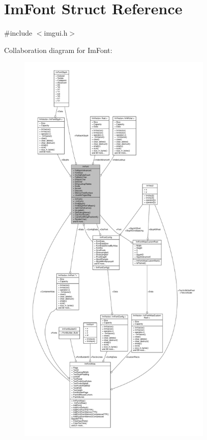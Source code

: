 \hypertarget{structImFont}{}\section{Im\+Font Struct Reference}
\label{structImFont}


{\ttfamily \#include $<$imgui.\+h$>$}



Collaboration diagram for Im\+Font\+:
\nopagebreak
\begin{figure}[H]
\begin{center}
\leavevmode
\includegraphics[height=550pt]{structImFont__coll__graph}
\end{center}
\end{figure}
